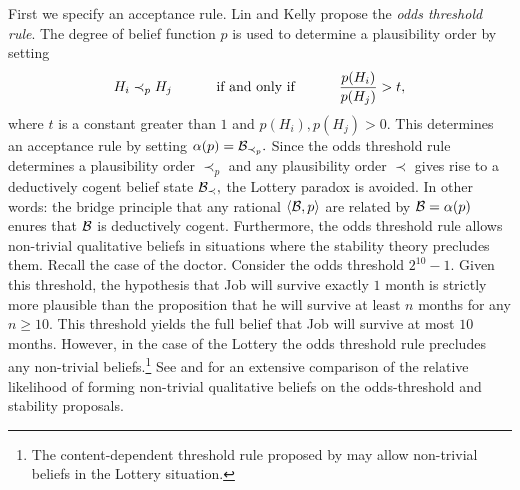 First we  specify an acceptance rule. Lin and Kelly propose the {\em odds
threshold rule}. The  degree of belief function $p$ is used to determine a
plausibility order by setting $$H_i \prec_p H_j \text{\hspace{10mm} if and only
if \hspace{10mm}} \frac{p(H_i)}{p(H_j)} > t,$$ where $t$ is a constant greater
than $1$ and $p(H_i),p(H_j)>0$. This determines an acceptance rule by setting
$\alpha(p)= \mathcal{B}_{\prec_p}.$ Since the odds threshold rule determines a
plausibility order $\prec_p$ and any plausibility order $\prec$  gives rise to a
deductively cogent belief state $\mathcal{B}_\prec,$ the Lottery paradox is avoided. In
other words: the bridge principle that any rational $\langle \mathcal{B},p \rangle$
are related by $\mathcal{B}=\alpha(p)$ enures that $\mathcal{B}$ is deductively cogent.
Furthermore, the odds threshold rule allows non-trivial qualitative beliefs in
situations where the stability theory precludes them. Recall the case of the
doctor. Consider the odds threshold $2^{10} -1$. Given this threshold, the
hypothesis that Job will survive exactly $1$ month is strictly more plausible
than the proposition that he will survive at least $n$ months for any $n\geq
10$. This threshold yields the full belief that Job will survive at most $10$
months. However, in the case of the Lottery the odds threshold rule precludes
any non-trivial beliefs.\footnote{The content-dependent threshold rule proposed
by \citet{lin2019correspondence} may allow non-trivial beliefs in the Lottery
situation.} See \citet{rott2017stability} and  \citet{douven2018probabilities}
for an extensive comparison of the relative likelihood of forming non-trivial
qualitative beliefs on the odds-threshold and stability proposals. 

